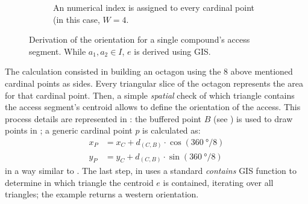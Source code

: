 \begin{wrapfigure}{r}{0.45\textwidth}
\begin{subfigure}[b]{.4\columnwidth}
                        \label{fig:comp-orient-3}
                    \end{subfigure}
                    \vspace{0.02\textheight}
                    \begin{subfigure}[b]{.4\columnwidth}
                        \centering
                        \begin{tikzpicture}[x=2.5pt,y=2.5pt,scale=0.09]
                            
                        \end{tikzpicture}
                        \caption{An numerical index is assigned to every cardinal point (in this case, $W=4$.}
                        \label{fig:comp-orient-4}
                    \end{subfigure}

                    \caption[Graphical rapresentation of the steps to derive compound's access orientation.]{Derivation of the orientation for a single compound's access segment. While $a_1, a_2 \in I$, $e$ is derived using GIS.}
                    \label{fig:comp-orient}
                \end{wrapfigure}

                The calculation consisted in building an octagon using the 8 above mentioned cardinal points as sides. Every triangular slice of the octagon represents the area for that cardinal point. Then, a simple \emph{spatial} check of which triangle contains the access segment's centroid allows to define the orientation of the access. This process details are represented in : the buffered point $B$ (see ) is used to draw points in ; a generic cardinal point $p$ is calculated as:
                \begin{align}
                    \label{eq:point-cardinal}
                    x_P &= x_C + d_{(C,B)}\cdot\cos{(\SI{360}{\degree}/8)}\\
                    y_P &= y_C + d_{(C,B)}\cdot\sin{(\SI{360}{\degree}/8)}
                \end{align}
                in a way similar to . The last step, in  uses a standard \emph{contains} GIS function to determine in which triangle the centroid $e$ is contained, iterating over all triangles; the example returns a western orientation.

